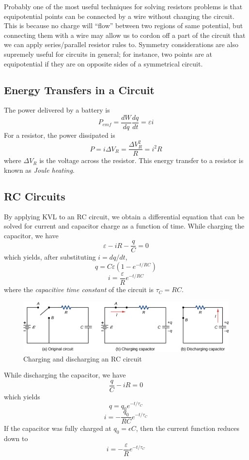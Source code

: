 \documentclass[../PhysicsFormulae]{subfiles}
\begin{document}
Probably one of the most useful techniques for solving resistors problems is that equipotential points can be connected by a wire without changing the circuit. This is because no charge will ``flow'' between two regions of same potential, but connecting them with a wire may allow us to cordon off a part of the circuit that we can apply series/parallel resistor rules to. Symmetry considerations are also supremely useful for circuits in general; for instance, two points are at equipotential if they are on opposite sides of a symmetrical circuit. 

\subsection{Energy Transfers in a Circuit}
The power delivered by a battery is 
\[ P_{emf} = \frac{dW}{dq} \frac{dq}{dt} = \varepsilon i \]
For a resistor, the power dissipated is 
\[ P = i \Delta V_R = \frac{\Delta V_R^2}{R} = i^2 R \]
where $\Delta V_R$ is the voltage across the resistor. This energy transfer to a resistor is known as \textit{Joule heating}. 

\subsection{RC Circuits}
By applying KVL to an RC circuit, we obtain a differential equation that can be solved for current and capacitor charge as a function of time. While charging the capacitor, we have 
\[ \varepsilon - iR - \frac{q}{C} = 0 \]
which yields, after substituting $i = dq/dt$, 
\[ q = C\varepsilon (1 - e^{-t/RC} ) \]
\[ i = \frac{\varepsilon}{R}e^{-t/RC} \]
where the \textit{capacitive time constant} of the circuit is $\tau_C = RC$. 

\begin{figure}[h]
	\centering
	\includegraphics[width=0.7\linewidth]{images/27.rc_circuit.jpg}
	\caption{Charging and discharging an RC circuit}
\end{figure}

While discharging the capacitor, we have 
\[ \frac{q}{C} - iR = 0 \]
which yields 
\[ q = q_0 e^{-t/\tau_C} \]
\[ i = -\frac{q_0}{RC}e^{-t/\tau_C} \]
If the capacitor was fully charged at $q_0 = \epsilon C$, then the current function reduces down to
\[ i = -\frac{\varepsilon}{R}e^{-t/\tau_C} \]
\end{document}

